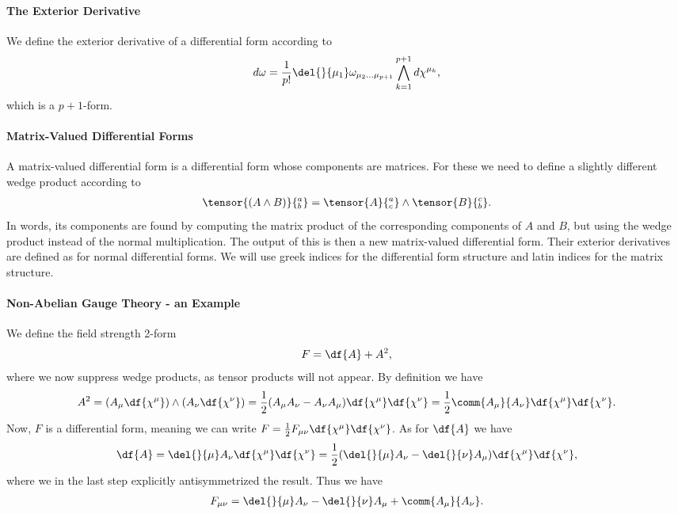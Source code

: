 \paragraph{The Exterior Derivative}
We define the exterior derivative of a differential form according to
\begin{align*}
	d\omega = \frac{1}{p!}\del{}{\mu_{1}}\omega_{\mu_{2}\dots \mu_{p + 1}}\bigwedge\limits_{k = 1}^{p + 1}d\chi^{\mu_{k}},
\end{align*}
which is a $p + 1$-form.

\paragraph{Matrix-Valued Differential Forms}
A matrix-valued differential form is a differential form whose components are matrices. For these we need to define a slightly different wedge product according to
\begin{align*}
	\tensor{(A\wedge B)}{^{a}_{b}} = \tensor{A}{^{a}_{c}}\wedge\tensor{B}{^{c}_{b}}.
\end{align*}
In words, its components are found by computing the matrix product of the corresponding components of $A$ and $B$, but using the wedge product instead of the normal multiplication. The output of this is then a new matrix-valued differential form. Their exterior derivatives are defined as for normal differential forms. We will use greek indices for the differential form structure and latin indices for the matrix structure.

\paragraph{Non-Abelian Gauge Theory - an Example}
We define the field strength 2-form
\begin{align*}
	F = \df{A} + A^{2},
\end{align*}
where we now suppress wedge products, as tensor products will not appear. By definition we have
\begin{align*}
	A^{2} = (A_{\mu}\df{\chi^{\mu}})\wedge(A_{\nu}\df{\chi^{\nu}}) = \frac{1}{2}(A_{\mu}A_{\nu} - A_{\nu}A_{\mu})\df{\chi^{\mu}}\df{\chi^{\nu}} = \frac{1}{2}\comm{A_{\mu}}{A_{\nu}}\df{\chi^{\mu}}\df{\chi^{\nu}}.
\end{align*}
Now, $F$ is a differential form, meaning we can write $F = \frac{1}{2}F_{\mu\nu}\df{\chi^{\mu}}\df{\chi^{\nu}}$. As for $\df{A}$ we have
\begin{align*}
	\df{A} = \del{}{\mu}A_{\nu}\df{\chi^{\mu}}\df{\chi^{\nu}} = \frac{1}{2}(\del{}{\mu}A_{\nu} - \del{}{\nu}A_{\mu})\df{\chi^{\mu}}\df{\chi^{\nu}},
\end{align*}
where we in the last step explicitly antisymmetrized the result. Thus we have
\begin{align*}
	F_{\mu\nu} = \del{}{\mu}A_{\nu} - \del{}{\nu}A_{\mu} + \comm{A_{\mu}}{A_{\nu}}.
\end{align*}

